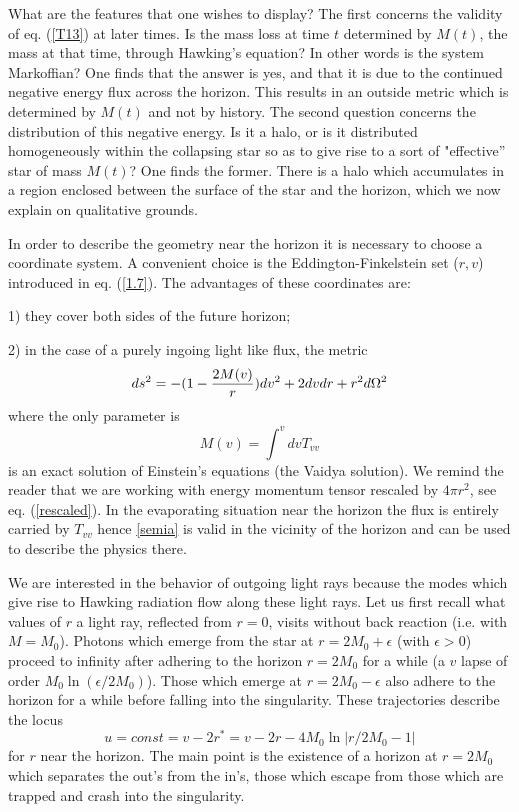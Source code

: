 \documentclass[12pt,oneside]{report}
\def\ge {\epsilon}
\begin{document}
What are the features that one wishes to display? The
first concerns the validity of eq. (\ref{T13}) at later times. Is
the mass loss at time $t$ determined by $M(t)$, the mass
at that time, through Hawking's equation? In other words
is the system Markoffian? One finds that the answer is
yes, and that it is due to the continued negative energy
flux across the horizon. This results in an outside
metric which is determined by $M(t)$ and not by history.
The second question concerns the distribution of this
negative energy. Is it a halo, or is it distributed
homogeneously within the collapsing star so as to give
rise to a sort of "effective'' star of mass $M(t)$? One
finds the former. There is a halo which accumulates in a
region enclosed between the surface of the star and the
 horizon,  which we now explain on qualitative grounds.

In order to describe the geometry near the horizon it is
necessary to choose a coordinate system. A convenient
choice is the Eddington-Finkelstein set ($r,v$) 
introduced in eq. (\ref{1.7}).
The advantages of these
coordinates are: 

1) they cover both sides of the future
horizon; 

2) in the case of a purely ingoing light
like flux, the metric
\begin{equation}
ds^2 = - (1 - {2 M(v) \over r}) dv^2  + 2 dvdr+  r^2
d\Omega^2
\label{semia}
\end{equation}
where the only parameter is 
\begin{equation}
M(v)= \int^v dv T_{vv}
\label{semib}
\end{equation}
is an exact solution of Einstein's equations (the Vaidya solution). 
We remind the reader that we are working with 
energy momentum tensor rescaled by $4 \pi r^2$, see eq. (\ref{rescaled}). 
In the
evaporating situation near the horizon the flux is
entirely carried by $T_{vv}$ hence \ref{semia} is valid
in the vicinity of the horizon and can be used to
describe the physics there.

We are interested in the behavior of outgoing light
rays because the modes 
which give rise to Hawking radiation flow along these light rays. 
Let us first recall what values of $r$ a light ray,
reflected from $r=0$, visits without back reaction (i.e. with 
$M= M_0$). Photons which emerge from the
star at $r=2M_0 + \ge$ (with $\ge >0$) proceed to infinity
after adhering to the horizon $r=2M_0$ for a while 
(a $v$ lapse of order $M_0\ln(\ge/ 2M_0)$). Those
which emerge at $r=2M_0 - \ge$ also adhere to the horizon
for a while before falling into the singularity. These
trajectories describe the locus 
\begin{equation}
u=const=v-2 r^* = 
v- 2r - 4M_0 \ln \vert r/ 2M_0-1 \vert
\label{ueq}
\end{equation}
for $r$ near the horizon.
The main point is the existence of a horizon at
$r=2M_0$ which separates the out's from the in's, those
which escape from those which are trapped and crash into the singularity.
\end{document}
